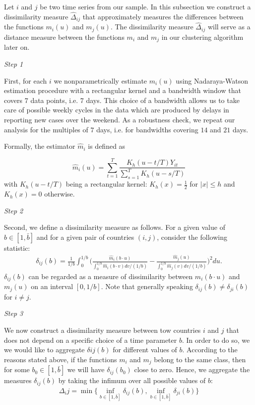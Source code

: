\documentclass[a4paper,11pt]{article}
\numberwithin{equation}{section}
\begin{document}
Let $i$ and $j$ be two time series from our sample. In this subsection we construct a dissimilarity measure $\hat{\Delta}_{ij}$ that approximately measures the differences between the functions $m_i(u)$ and $m_j(u)$. The dissimilarity measure $\hat{\Delta}_{ij}$ will serve as a distance measure between the functions $m_i$ and $m_j$ in our clustering algorithm later on.

\textit{Step 1}

First, for each $i$ we nonparametrically estimate $m_i(u)$ using Nadaraya-Watson estimation procedure with a rectangular kernel and a bandwidth window that covers $7$ data points, i.e. $7$ days. This choice of a bandwidth allows us to take care of possible weekly cycles in the data which are produced by delays in reporting new cases over the weekend. As a robustness check, we repeat our analysis for the multiples of $7$ days, i.e. for bandwidths covering $14$ and $21$ days.

Formally, the estimator $\hat{m}_i$ is defined as

$$\hat{m}_i(u) = \sum_{t=1}^T \frac{K_h(u - t/T) Y_{it}}{\sum_{s=1}^T K_h(u - s/T)}$$
with $K_h(u - t/T)$ being a rectangular kernel: $K_h(x) = \frac{1}{2}$ for $|x| \leq h$ and $K_h(x) = 0$ otherwise.

\textit{Step 2}

Second, we define a dissimilarity measure as follows. For a given value of $b \in [1, \bar{b}]$ and for a given pair of countries $(i, j)$, consider the following statistic:
\begin{align*}
	\delta_{ij}(b) = \frac{1}{1/b} \int_0^{1/b} \bigg( \frac{\hat{m}_i (b\cdot u)}{\int_0^{1/b} \hat{m}_i(b\cdot v) dv /(1/b)}  - \frac{\hat{m}_j (u)}{\int_0^{1/b} \hat{m}_j(v) dv /(1/b)}  \bigg)^2 du.
\end{align*}
$\delta_{ij}(b)$ can be regarded as a measure of dissimilarity between $m_i(b \cdot u)$ and $m_j(u)$ on an interval $[0, 1/b]$. Note that generally speaking $\delta_{ij}(b) \neq \delta_{ji}(b)$ for $i \neq j$.

\textit{Step 3}

We now construct a dissimilarity measure between tow countries $i$ and $j$ that does not depend on a specific choice of a time parameter $b$. In order to do so, we we would like to aggregate $\delta{ij}(b)$ for different values of $b$. According to the reasons stated above, if the functions $m_i$ and $m_j$ belong to the same class, then for some $b_0\in [1, \bar{b}]$ we will have $\delta_{ij}(b_0)$ close to zero. Hence, we aggregate the measures $\delta_{ij} (b)$ by taking the infimum over all possible values of $b$:
\begin{align*}
	\Delta_ij = \min \{ \inf_{b\in [1, \bar{b}]} \delta_{ij}(b), \inf_{b\in [1, \bar{b}]} \delta_{ji}(b) \}
\end{align*}
\end{document}

